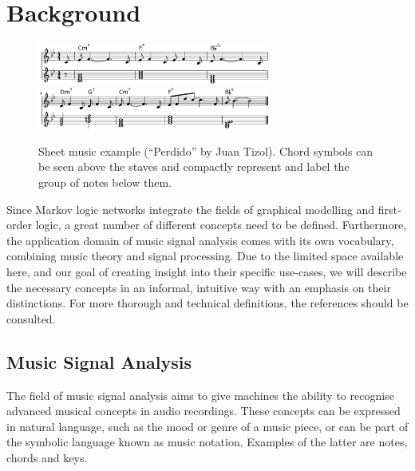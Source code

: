 \documentclass[letterpaper]{article} %
\begin{document}
\section{Background}

\begin{figure}[t]
\centering
\includegraphics[width=0.68\textwidth]{perdido1} 
\includegraphics[width=0.68\textwidth]{perdido2} 
\caption{Sheet music example (``Perdido'' by Juan Tizol). Chord symbols can be seen above the staves and compactly represent and label the group of notes below them.\label{fig:sheet-music}}
\end{figure}

Since Markov logic networks integrate the fields of graphical modelling and first-order logic, a great number of different concepts need to be defined. Furthermore, the application domain of music signal analysis comes with its own vocabulary, combining music theory and signal processing. Due to the limited space available here, and our goal of creating insight into their specific use-cases, we will describe the necessary concepts in an informal, intuitive way with an emphasis on their distinctions. For more thorough and technical definitions, the references should be consulted.

\subsection{Music Signal Analysis}

The field of music signal analysis aims to give machines the ability to recognise advanced musical concepts in audio recordings. These concepts can be expressed in natural language, such as the mood or genre of a music piece, or can be part of the symbolic language known as music notation. 
Examples of the latter are notes, chords and keys.
\end{document}
